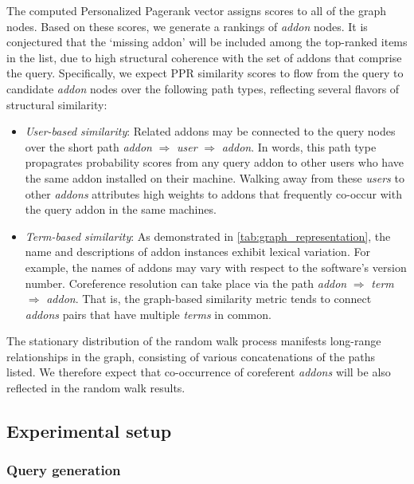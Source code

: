 \documentclass[ijoc,nonblindrev]{informs3} %
\numberwithin{equation}{subsection}
\begin{document}
The computed Personalized Pagerank vector assigns scores to all of the graph nodes. Based on these scores, we generate a rankings of {\it addon} nodes. It is conjectured that the `missing addon' will be included among the top-ranked items in the list, due to high structural coherence with the set of addons that comprise the query. Specifically, we expect PPR similarity scores to flow from the query to candidate {\it addon} nodes over the following path types, reflecting several flavors of structural similarity:
\begin{itemize}
\item {\it User-based similarity}: Related addons may be connected to the query nodes over the short path  {\it addon} $\Rightarrow$ {\it user}
   $\Rightarrow$ {\it addon}. In words, this path type propagrates probability scores from any query addon to other users who have the same addon installed on their machine. Walking away from these {\it users} to other {\it addons} attributes high weights to addons that frequently co-occur with the query addon in the same machines. 
\item {\it Term-based similarity}: As demonstrated in \autoref{tab:graph_representation}, the name and descriptions of addon instances exhibit lexical variation. For example, the names of addons may vary with respect to the software's version number. Coreference resolution can take place via the path {\it addon} $\Rightarrow$ {\it term} $\Rightarrow$ {\it addon}. That is, the graph-based similarity metric tends to connect {\it addons} pairs that have multiple {\it terms} in common. 
\end{itemize}
The stationary distribution of the random walk process manifests long-range relationships in the graph, consisting of various concatenations of the paths listed. We therefore expect that co-occurrence of coreferent {\it addons} will be also reflected in the random walk results.

\subsection{Experimental setup}

\subsubsection{Query generation}
\end{document}
